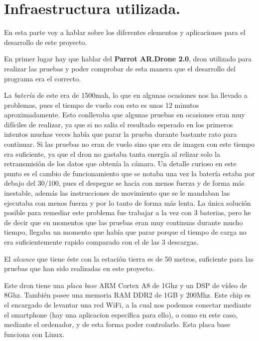 \chapter{Infraestructura utilizada.}\label{cap.infraestructura}
En esta parte voy a hablar sobre los diferentes elementos y aplicaciones para el desarrollo de este proyecto.

\hspace{1 cm} En primer lugar hay que hablar del \textbf{Parrot AR.Drone 2.0}, dron utilizado para realizar las pruebas y poder comprobar de esta manera que el desarrollo del programa era el correcto. 

\hspace{1 cm} La \textsl{bater\'ia} de este era de 1500mah, lo que en algunas ocasiones nos ha llevado a problemas, pues el tiempo de vuelo con esto es unos 12 minutos aproximadamente. Esto conllevaba que algunas pruebas en ocasiones eran muy dif\'iciles de realizar, ya que si no salia el resultado esperado en los primeros intentos muchas veces hab\'ia que parar la prueba durante bastante rato para continuar. Si las pruebas no eran de vuelo sino que era de imagen con este tiempo era suficiente, ya que el dron no gastaba tanta energ\'ia al relizar solo la retransmisi\'on de los datos que obten\'ia la c\'amara. Un detalle curioso en este punto es el cambio de funcionamiento que se notaba una vez la bater\'ia estaba por debajo del 30/100, pues el despegue se hacia con menos fuerza y de forma m\'as inestable, adem\'as las instrucciones de movimiento que se le mandaban las ejecutaba con menos fuerza y por lo tanto de forma m\'as lenta. La \'unica soluci\'on posible para remediar este problema fue trabajar a la vez con 3 baterias, pero he de decir que en momentos que las pruebas eran muy continuas durante mucho tiempo, llegaba un momento que hab\'ia que parar porque el tiempo de carga no era suficientemente rapido comparado con el de las 3 descargas. 

\hspace{1 cm} El \textsl{alcance} que tiene \'este con la estaci\'on tierra es de 50 metros, suficiente para las pruebas que han sido realizadas en este proyecto. 

\hspace{1 cm} Este dron tiene una \textsl{placa base} ARM Cortex A8 de 1Ghz y un DSP de v\'ideo de 8Ghz. Tambi\'en posee una memoria RAM DDR2 de 1GB y 200Mhz. Este chip es el encargado de levantar una red WiFi, a la cual nos podemos conectar mediante el smartphone (hay una aplicacion espec\'ifica para ello), o como en este caso, mediante el ordenador, y de esta forma poder controlarlo. Esta placa base funciona con Linux. 


